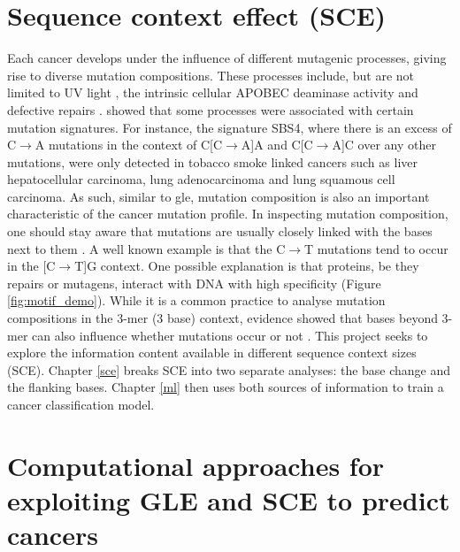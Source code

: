\section{Sequence context effect (SCE)}
\label{intro:sce}

Each cancer develops under the influence of different mutagenic processes, giving rise to diverse mutation compositions. These processes include, but are not limited to UV light \citep[known in skin melanoma;][]{Mohania2017}, the intrinsic cellular APOBEC deaminase activity \citep[\textit{e.g.} in B cells;][]{Kuppers2005MechanismsPathogenesis} and defective repairs \citep[\textit{e.g.} mutated \textit{BRCA} genes in breast cancer;][]{Navasardyan2021YY1TNBC}. \citet{Alexandrov2013, Alexandrov2020} showed that some processes were associated with certain mutation signatures. For instance, the signature SBS4, where there is an excess of C$\rightarrow$A mutations in the context of C[C$\rightarrow$A]A and C[C$\rightarrow$A]C over any other mutations, were only detected in tobacco smoke linked cancers such as liver hepatocellular carcinoma, lung adenocarcinoma and lung squamous cell carcinoma. As such, similar to \gls{gle}, mutation composition is also an important characteristic of the cancer mutation profile. In inspecting mutation composition, one should stay aware that mutations are usually closely linked with the \glspl{base} next to them \citep{Zhu2017}. A well known example is that the C$\rightarrow$T mutations tend to occur in the [C$\rightarrow$T]G context. One possible explanation is that proteins, be they repairs or mutagens, interact with DNA with high specificity (Figure \ref{fig:motif_demo}). While it is a common practice to analyse mutation compositions in the 3-mer (3 base) context, evidence showed that bases beyond 3-mer can also influence whether mutations occur or not \citep{Zhu2017,Zhu2020}. This project seeks to explore the information content available in different sequence context sizes (SCE). Chapter \ref{sce} breaks SCE into two separate analyses: the base change and the flanking bases. Chapter \ref{ml} then uses both sources of information to train a cancer classification model.  



\section{Computational approaches for exploiting GLE and SCE to predict cancers}
\label{intro:ml}

